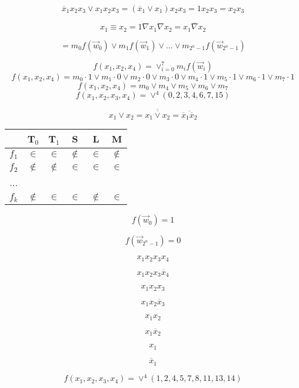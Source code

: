 \documentclass[a4paper]{report}
\newcommand{\ol}{\overline}
\begin{document}
$$
\ol x_1 x_2 x_3 \vee x_1 x_2 x_3 = (\ol x_1 \vee x_1) x_2 x_3 = 1 x_2 x_3 = x_2 x_3
$$

$$
x_1 \equiv x_2 = 1 \nabla x_1 \nabla x_2 = \ol{x_1 \nabla x_2}
$$


\begin{equation}
=m_0 f(\vec{w}_0) \vee m_1 f(\vec{w}_1) \vee ... \vee m_{2^n-1} f(\vec{w}_{2^n-1})
\end{equation}

\begin{equation}
    f(x_1,x_2,x_4)=\vee_{i=0}^{7}m_i f(\vec{w}_i)
\end{equation}
\begin{equation}
    f(x_1,x_2,x_4)=m_0 \cdot 1 \vee m_1 \cdot 0 \vee m_2 \cdot 0 \vee m_3 \cdot 0 \vee m_4 \cdot 1 \vee m_5 \cdot 1 \vee m_6 \cdot 1 \vee m_7 \cdot 1 
\end{equation}
\begin{equation}
    f(x_1,x_2,x_4)=m_0 \vee m_4 \vee m_5  \vee m_6  \vee m_7
\end{equation}
\begin{equation}
    f(x_1,x_2,x_3,x_4)=\vee^4(0,2,3,4,6,7,15)
\end{equation}

$$
x_1 \vee x_2 = \ol{\ol{x_1 \vee x_2}} = \ol{\ol x_1 \ol x_2}
$$

\begin{tabular}{c|ccccc}
     &  T$_0$ &  T$_1$ &  S & L & M \\
     \hline
     $f_1$ & $\in$ & $\in$ & $\notin$ & $\in$ & $\notin$ \\
     $f_2$ & $\notin$ & $\notin$ & $\in$ & $\in$ & $\in$ \\
     ...\\
     $f_k$ & $\notin$ & $\in$ & $\in$ & $\notin$ & $\in$ \\ 
\end{tabular}

$$
f(\vec{w}_0) = 1
$$

$$
f(\vec{w}_{2^n-1}) = 0
$$

$$
x_1 x_2 x_3 x_4
$$

$$
x_1 x_2 x_3 \ol x_4
$$

$$
x_1 x_2 x_3
$$

$$
x_1 x_2 \ol x_3
$$


$$
x_1 x_2
$$

$$
x_1 \ol x_2
$$

$$
x_1
$$

$$
\ol x_1
$$

$$
f(x_1, x_2, x_3, x_4) = \vee^4(1,2,4,5,7,8,11,13,14)
$$
\end{document}
